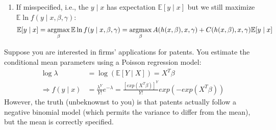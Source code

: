 \documentclass[11pt]{elegantbook}
\newcommand{\argmax}{\operatornamewithlimits{argmax}}
\begin{document}
\begin{enumerate}[(a).]
\begin{enumerate}[$\circ$]
        \item If misspecified, i.e., the $y\mid x$ has expectation $\mathbb{E}[y\mid x]$ but we still maximize $\mathbb{E}\ln f(y\mid x,\beta,\gamma)$:
        \begin{equation}
            \begin{aligned}
                \mathbb{E}[y\mid x]=\argmax_\beta\mathbb{E}\ln f(y\mid x,\beta,\gamma)=\argmax_\beta A(h(x,\beta),x,\gamma)+C(h(x,\beta),x,\gamma)\mathbb{E}[y\mid x]
            \end{aligned}
            \nonumber
        \end{equation}
    \end{enumerate}
\end{enumerate}
Suppose you are interested in firms' applications for patents. You estimate the conditional mean parameters using a Poisson regression model:
\begin{equation}
    \begin{aligned}
        \log\lambda&=\log\left(\mathbb{E}[Y\mid X]\right)=X^T\beta\\
        \Rightarrow f(y\mid x)&=\frac{\lambda^Y}{Y!}e^{-\lambda}=\frac{[exp(X^T\beta)]^Y}{Y!}exp(-exp(X^T\beta))
    \nonumber
    \end{aligned}
\end{equation}
However, the truth (unbeknownst to you) is that patents actually follow a negative binomial model (which permits the variance to differ from the mean), but the mean is correctly specified.
\end{document}
